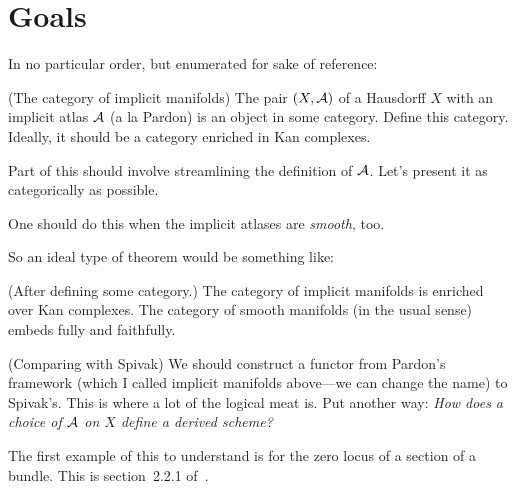 

\section{Goals}
In no particular order, but enumerated for sake of reference:
\enum
	\item (The category of implicit manifolds)
		The pair $(X, \mathcal A)$ of a Hausdorff $X$ with an implicit atlas $\mathcal A$ (a la Pardon) is an object in some category. Define this category. Ideally, it should be a category enriched in Kan complexes.
			\enum
				\item
					Part of this should involve streamlining the definition of $\mathcal A$. Let's present it as categorically as possible.
				\item
					One should do this when the implicit atlases are {\em smooth}, too.
				\item
					So an ideal type of theorem would be something like:
						\begin{theorem}
						(After defining some category.) The category of implicit manifolds is enriched over Kan complexes. The category of smooth manifolds (in the usual sense) embeds fully and faithfully.
						\end{theorem}
				\item {}
			\enumd
	\item (Comparing with Spivak)
		We should construct a functor from Pardon's framework (which I called implicit manifolds above---we can change the name) to Spivak's. This is where a lot of the logical meat is. Put another way: {\em How does a choice of $\mathcal A$ on $X$ define a derived scheme?}
			\enum
				\item
					The first example of this to understand is for the zero locus of a section of a bundle. This is section~2.2.1 of~\cite{pardon}.
				\item
